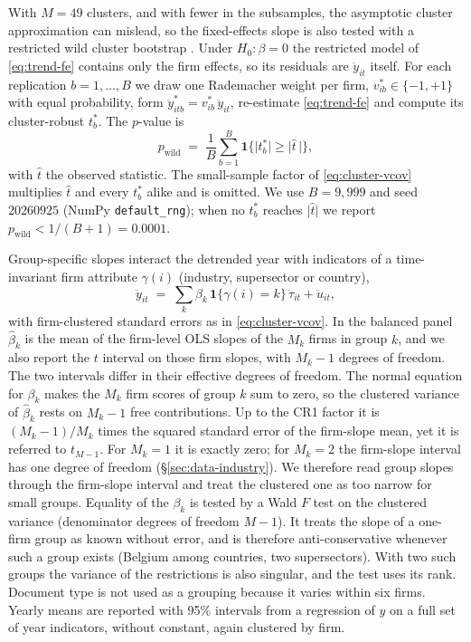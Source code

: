 With $M = 49$ clusters, and with fewer in the subsamples, the asymptotic cluster
approximation can mislead, so the fixed-effects slope is also tested with a
restricted wild cluster bootstrap \citep{cameron2008}. Under
$H_0\!: \beta = 0$ the restricted model of \eqref{eq:trend-fe} contains only
the firm effects, so its residuals are $\ddot y_{it}$ itself. For each
replication $b = 1, \dots, B$ we draw one Rademacher weight per firm,
$v^{*}_{ib} \in \{-1, +1\}$ with equal probability, form
$\ddot y^{*}_{itb} = v^{*}_{ib}\,\ddot y_{it}$, re-estimate
\eqref{eq:trend-fe} and compute its cluster-robust $t^{*}_b$. The $p$-value is
\begin{equation}
\label{eq:wild-p}
p_{\mathrm{wild}} \;=\; \frac{1}{B}\sum_{b=1}^{B}
\mathbf{1}\bigl\{\lvert t^{*}_b\rvert \geq \lvert \hat t\,\rvert\bigr\},
\end{equation}
with $\hat t$ the observed statistic. The small-sample factor of
\eqref{eq:cluster-vcov} multiplies $\hat t$ and every $t^{*}_b$ alike and
is omitted. We use $B = 9{,}999$ and seed $20260925$ (NumPy
\texttt{default\_rng}); when no $t^{*}_b$ reaches $\lvert\hat t\rvert$ we
report $p_{\mathrm{wild}} < 1/(B+1) = 0.0001$.

Group-specific slopes interact the detrended year with indicators of a
time-invariant firm attribute $\gamma(i)$ (industry, supersector or country),
\begin{equation}
\label{eq:trend-group}
\ddot y_{it} \;=\; \sum_{k} \beta_k\,\mathbf{1}\{\gamma(i) = k\}\,\ddot\tau_{it}
+ \ddot u_{it},
\end{equation}
with firm-clustered standard errors as in \eqref{eq:cluster-vcov}. In the
balanced panel $\hat\beta_k$ is the mean of the firm-level OLS slopes of the
$M_k$ firms in group $k$, and we also report the $t$ interval on those firm
slopes, with $M_k - 1$ degrees of freedom. The two intervals differ in
their effective degrees of freedom. The normal equation for $\beta_k$ makes
the $M_k$ firm scores of group $k$ sum to zero, so the clustered variance of
$\hat\beta_k$ rests on $M_k - 1$ free contributions. Up to the CR1 factor it
is $(M_k-1)/M_k$ times the squared standard error of the firm-slope mean,
yet it is referred to $t_{M-1}$. For $M_k = 1$ it is exactly zero; for
$M_k = 2$ the firm-slope interval has one degree of freedom
(\S\ref{sec:data-industry}). We therefore read group slopes through the
firm-slope interval and treat the clustered one as too narrow for small
groups. Equality of the $\beta_k$ is tested by a Wald $F$ test on the
clustered variance (denominator degrees of freedom $M-1$). It treats the
slope of a one-firm group as known without error, and is therefore
anti-conservative whenever such a group exists (Belgium among countries, two
supersectors). With two such groups the variance of the restrictions is also
singular, and the test uses its rank. Document type is not used as a grouping because it varies within
six firms. Yearly means are
reported with 95\% intervals from a regression of $y$ on a full set of year
indicators, without constant, again clustered by firm.

